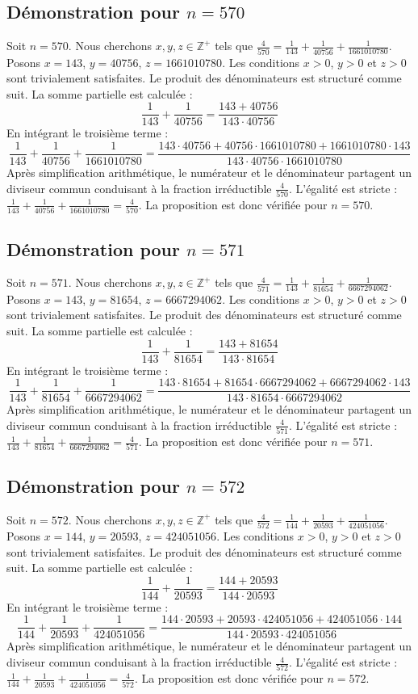 \documentclass[11pt,a4paper]{article}
\begin{document}
\subsection{Démonstration pour $n = 570$}
Soit $n = 570$. Nous cherchons $x, y, z \in \mathbb{Z}^{+}$ tels que $\frac{4}{570} = \frac{1}{143} + \frac{1}{40756} + \frac{1}{1661010780}$.
Posons $x = 143$, $y = 40756$, $z = 1661010780$.
Les conditions $x > 0$, $y > 0$ et $z > 0$ sont trivialement satisfaites.
Le produit des dénominateurs est structuré comme suit. La somme partielle est calculée :
$$ \frac{1}{143} + \frac{1}{40756} = \frac{143+40756}{143 \cdot 40756} $$
En intégrant le troisième terme :
$$ \frac{1}{143} + \frac{1}{40756} + \frac{1}{1661010780} = \frac{143 \cdot 40756 + 40756 \cdot 1661010780 + 1661010780 \cdot 143}{143 \cdot 40756 \cdot 1661010780} $$
Après simplification arithmétique, le numérateur et le dénominateur partagent un diviseur commun conduisant à la fraction irréductible $\frac{4}{570}$.
L'égalité est stricte : $\frac{1}{143} + \frac{1}{40756} + \frac{1}{1661010780} = \frac{4}{570}$.
La proposition est donc vérifiée pour $n = 570$.
\subsection{Démonstration pour $n = 571$}
Soit $n = 571$. Nous cherchons $x, y, z \in \mathbb{Z}^{+}$ tels que $\frac{4}{571} = \frac{1}{143} + \frac{1}{81654} + \frac{1}{6667294062}$.
Posons $x = 143$, $y = 81654$, $z = 6667294062$.
Les conditions $x > 0$, $y > 0$ et $z > 0$ sont trivialement satisfaites.
Le produit des dénominateurs est structuré comme suit. La somme partielle est calculée :
$$ \frac{1}{143} + \frac{1}{81654} = \frac{143+81654}{143 \cdot 81654} $$
En intégrant le troisième terme :
$$ \frac{1}{143} + \frac{1}{81654} + \frac{1}{6667294062} = \frac{143 \cdot 81654 + 81654 \cdot 6667294062 + 6667294062 \cdot 143}{143 \cdot 81654 \cdot 6667294062} $$
Après simplification arithmétique, le numérateur et le dénominateur partagent un diviseur commun conduisant à la fraction irréductible $\frac{4}{571}$.
L'égalité est stricte : $\frac{1}{143} + \frac{1}{81654} + \frac{1}{6667294062} = \frac{4}{571}$.
La proposition est donc vérifiée pour $n = 571$.
\subsection{Démonstration pour $n = 572$}
Soit $n = 572$. Nous cherchons $x, y, z \in \mathbb{Z}^{+}$ tels que $\frac{4}{572} = \frac{1}{144} + \frac{1}{20593} + \frac{1}{424051056}$.
Posons $x = 144$, $y = 20593$, $z = 424051056$.
Les conditions $x > 0$, $y > 0$ et $z > 0$ sont trivialement satisfaites.
Le produit des dénominateurs est structuré comme suit. La somme partielle est calculée :
$$ \frac{1}{144} + \frac{1}{20593} = \frac{144+20593}{144 \cdot 20593} $$
En intégrant le troisième terme :
$$ \frac{1}{144} + \frac{1}{20593} + \frac{1}{424051056} = \frac{144 \cdot 20593 + 20593 \cdot 424051056 + 424051056 \cdot 144}{144 \cdot 20593 \cdot 424051056} $$
Après simplification arithmétique, le numérateur et le dénominateur partagent un diviseur commun conduisant à la fraction irréductible $\frac{4}{572}$.
L'égalité est stricte : $\frac{1}{144} + \frac{1}{20593} + \frac{1}{424051056} = \frac{4}{572}$.
La proposition est donc vérifiée pour $n = 572$.
\end{document}
